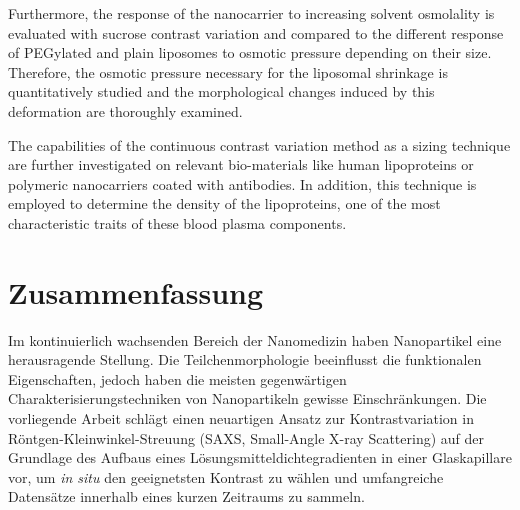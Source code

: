 Furthermore, the response of the nanocarrier to increasing solvent osmolality is evaluated with sucrose contrast variation and compared to the different response of PEGylated and plain liposomes to osmotic pressure depending on their size. Therefore, the osmotic pressure necessary for the liposomal shrinkage is quantitatively studied and the morphological changes induced by this deformation are thoroughly examined.


The capabilities of the continuous contrast variation method as a sizing technique  are further investigated on relevant bio-materials like human lipoproteins or polymeric nanocarriers coated with antibodies. In addition, this technique is employed to determine the density of the lipoproteins, one of the most characteristic traits of these blood plasma components.





\normalsize

\cleardoublepage

\thispagestyle{empty}

\chapter*{Zusammenfassung}



Im kontinuierlich wachsenden Bereich der Nanomedizin haben Nanopartikel eine herausragende Stellung. Die Teilchenmorphologie beeinflusst die funktionalen Eigenschaften, jedoch haben die meisten gegenwärtigen Charakterisierungstechniken von Nanopartikeln gewisse Einschränkungen. Die vorliegende Arbeit schlägt einen neuartigen Ansatz zur Kontrastvariation in Röntgen-Kleinwinkel-Streuung (SAXS, Small-Angle X-ray Scattering) auf der Grundlage des Aufbaus eines Lösungsmitteldichtegradienten in einer Glaskapillare vor, um \emph{in situ} den geeignetsten Kontrast zu wählen und umfangreiche Datensätze innerhalb eines kurzen Zeitraums zu sammeln.


